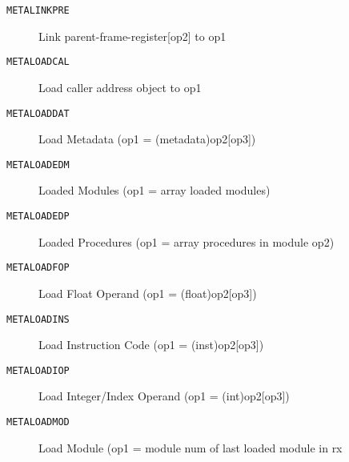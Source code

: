 
\begin{description}
\item[\texttt{METALINKPRE}]    Link parent-frame-register[op2] to op1\\
\end{description}

\begin{description}
\item[\texttt{METALOADCAL}]          Load caller address object to op1\\
\end{description}

\begin{description}
\item[\texttt{METALOADDAT}]    Load Metadata (op1 = (metadata)op2[op3])\\
\end{description}

\begin{description}
\item[\texttt{METALOADEDM}]         Loaded Modules (op1 = array loaded modules)\\
\end{description}

\begin{description}
\item[\texttt{METALOADEDP}]       Loaded Procedures (op1 = array procedures in module op2)\\
\end{description}

\begin{description}
\item[\texttt{METALOADFOP}]        Load Float Operand (op1 = (float)op2[op3])\\
\end{description}

\begin{description}
\item[\texttt{METALOADINS}]    Load Instruction Code (op1 = (inst)op2[op3])\\
\end{description}

\begin{description}
\item[\texttt{METALOADIOP}]        Load Integer/Index Operand (op1 = (int)op2[op3])\\
\end{description}

\begin{description}
\item[\texttt{METALOADMOD}]      Load Module (op1 = module num of last loaded module in rx\\
\end{description}
